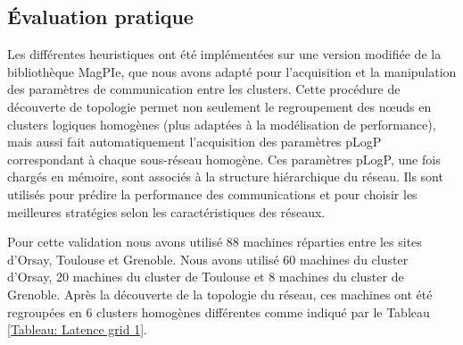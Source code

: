 \subsection{Évaluation pratique}

Les différentes heuristiques ont été implémentées sur une version modifiée
de la bibliothèque MagPIe, que nous avons adapté pour l'acquisition
et la manipulation des paramètres de communication entre les  clusters. Cette procédure de
découverte de topologie permet non seulement le regroupement des n{\oe}uds
en clusters logiques homogènes (plus adaptées à la modélisation de
performance), mais aussi fait automatiquement l'acquisition des paramètres
pLogP correspondant à chaque sous-réseau homogène. Ces paramètres
pLogP, une fois chargés en mémoire, sont associés à la structure hiérarchique
du réseau. Ils sont utilisés pour prédire la performance des communications et pour choisir les meilleures
stratégies selon les caractéristiques des réseaux.

Pour cette validation nous avons utilisé 88 machines réparties entre les sites
d'Orsay, Toulouse et Grenoble. Nous avons utilisé 60 machines
du  cluster d'Orsay, 20 machines du  cluster de Toulouse et
8 machines du  cluster de Grenoble. Après la découverte de la topologie du réseau, ces machines ont été regroupées en 6
clusters homogènes différentes comme indiqué par le Tableau \ref{Tableau: Latence grid 1}. 

